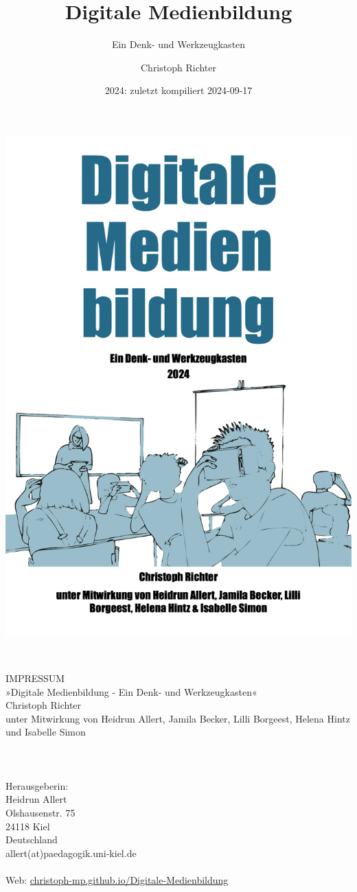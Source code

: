 \documentclass[
  a4paper,
]{book}
\title{Digitale Medienbildung}
\subtitle{Ein Denk- und Werkzeugkasten}
\author{Christoph Richter}
\date{2024: zuletzt kompiliert 2024-09-17}
\begin{document}
\maketitle


\includegraphics[width=\textwidth, height=0.99\textheight]{Figures/Cover.png}


\newpage
~\vfill
\thispagestyle{empty}

\noindent IMPRESSUM\\
\noindent »Digitale Medienbildung - Ein Denk- und Werkzeugkasten«\\
\noindent Christoph Richter\\
\noindent unter Mitwirkung von Heidrun Allert, Jamila Becker, Lilli Borgeest, Helena Hintz und Isabelle Simon\\
\\
\\
\\
\noindent Herausgeberin:\\
Heidrun Allert\\
Olshausenstr. 75\\
24118 Kiel\\
Deutschland\\
allert(at)paedagogik.uni-kiel.de\\
\\
\noindent Web: \href{https://christoph-mp.github.io/Digitale-Medienbildung/}{christoph-mp.github.io/Digitale-Medienbildung}\\ %
\end{document}
